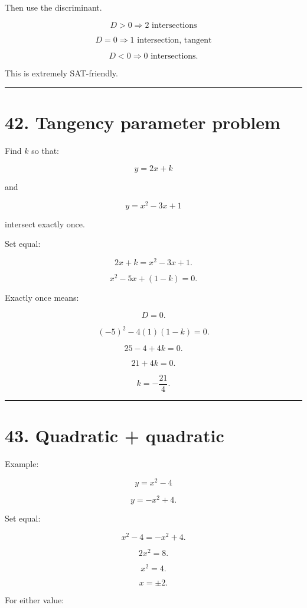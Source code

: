 \documentclass[
]{article}
\begin{document}
Then use the discriminant.

\[
D>0\Rightarrow2\text{ intersections}
\]

\[
D=0\Rightarrow1\text{ intersection, tangent}
\]

\[
D<0\Rightarrow0\text{ intersections}.
\]

This is extremely SAT-friendly.

\begin{center}\rule{0.5\linewidth}{0.5pt}\end{center}

\section{42. Tangency parameter
problem}\label{tangency-parameter-problem}

Find \(k\) so that:

\[
y=2x+k
\]

and

\[
y=x^2-3x+1
\]

intersect exactly once.

Set equal:

\[
2x+k=x^2-3x+1.
\]

\[
x^2-5x+(1-k)=0.
\]

Exactly once means:

\[
D=0.
\]

\[
(-5)^2-4(1)(1-k)=0.
\]

\[
25-4+4k=0.
\]

\[
21+4k=0.
\]

\[
\boxed{k=-\frac{21}{4}}.
\]

\begin{center}\rule{0.5\linewidth}{0.5pt}\end{center}

\section{43. Quadratic + quadratic}\label{quadratic-quadratic}

Example:

\[
y=x^2-4
\]

\[
y=-x^2+4.
\]

Set equal:

\[
x^2-4=-x^2+4.
\]

\[
2x^2=8.
\]

\[
x^2=4.
\]

\[
x=\pm2.
\]

For either value:
\end{document}
